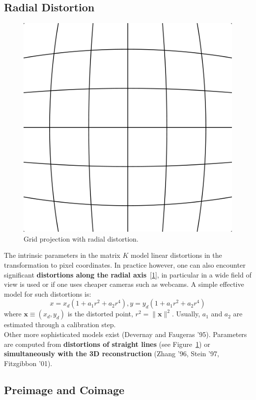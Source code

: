 \subsection{Radial Distortion}%
\label{sub:radial_distortion}


\begin{figure}[h]
\centering
\includegraphics[width=0.5\columnwidth]{assets/img/barrel_distortion.png}
\caption{Grid projection with radial distortion.}%
\label{fig:radial_distortion}
\end{figure}

The intrinsic parameters in the matrix $K$ model linear distortions
in the transformation to pixel coordinates.
In practice however, one can also encounter significant
\textbf{distortions along the radial axis}~[\ref{fig:radial_distortion}],
in particular in a wide field of view is used or if one uses cheaper cameras
such as webcams.
A simple effective model for such distortions is:
\[
	x = x_d ( 1 + a_1 r^2 + a_2 r^4 ),
	y = y_d ( 1 + a_1 r^2 + a_2 r^4 )
\]
where $\bm{x} \equiv (x_d, y_d)$ is the distorted point,
$r^2 = \|\bm{x}\|^2$.
Usually, $a_1$ and $a_2$ are estimated through a calibration step.\\

Other more sophisticated models exist (Devernay and Faugeras '95).
Parameters are computed from
\textbf{distortions of straight lines} (see Figure~\ref{fig:radial_distortion})
or \textbf{simultaneously with the 3D reconstruction}
(Zhang '96, Stein '97, Fitzgibbon '01).


\subsection{Preimage and Coimage}%
\label{sub:preimage_and_coimage}


